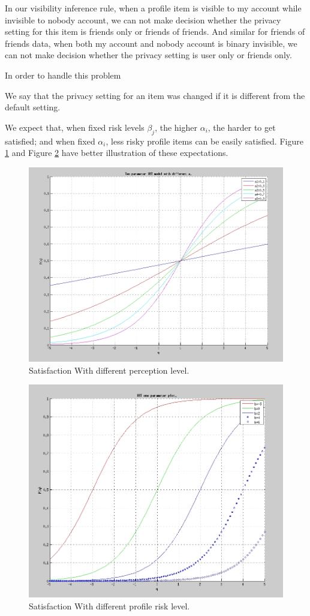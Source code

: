 \documentclass[a4paper]{article}
\begin{document}
In our visibility inference rule, when a profile item is visible to my
account while invisible to nobody account, we can not make decision
whether the privacy setting for this item is friends only or friends
of friends. And similar for friends of friends data, when both my
account and nobody account is binary invisible, we can not make
decision whether the privacy setting is user only or friends only. 

In order to handle this problem 

We say that the privacy setting for an item was changed if it is
different from the default setting. 

We expect that, when fixed risk levels $\beta_j$, the higher
$\alpha_i$, the harder to get satisfied; and when fixed $\alpha_i$,
less risky profile items can be easily satisfied. Figure \ref{fig:irta}
and Figure \ref{fig:irtb} have better illustration of these
expectations.
\begin{figure}[H]
  \centering
  \includegraphics[width=.7\textwidth]{IRT-a.jpg}
  \caption{Satisfaction With different perception level.}
  \label{fig:irta}
\end{figure}

\begin{figure}[H]
  \centering
  \includegraphics[width=.7\textwidth]{IRT-b.jpg}
  \caption{Satisfaction With different profile risk level.}
  \label{fig:irtb}
\end{figure}
\end{document}
